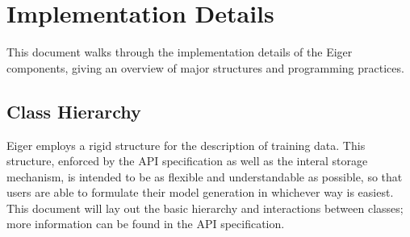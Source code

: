 \section{Implementation Details}
\label{sec:imp}
This document walks through the implementation details of the Eiger components,
giving an overview of major structures and programming practices.

\subsection{Class Hierarchy}
Eiger employs a rigid structure for the description of training data. This
structure, enforced by the API specification as well as the interal storage
mechanism, is intended to be as flexible and understandable as possible, so
that users are able to formulate their model generation in whichever way is
easiest. This document will lay out the basic hierarchy and interactions
between classes; more information can be found in the API specification.

